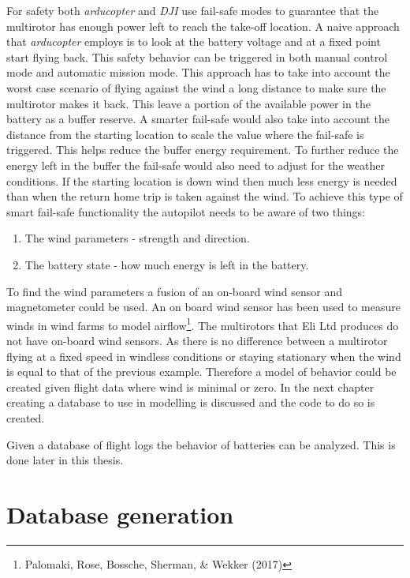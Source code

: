 \documentclass[12pt,oneside]{reedthesis}
\theoremstyle{definition}
\theoremstyle{definition}
\theoremstyle{definition}
\theoremstyle{remark}
\begin{document}
For safety both \emph{arducopter} and \emph{DJI} use fail-safe modes to
guarantee that the multirotor has enough power left to reach the
take-off location. A naive approach that \emph{arducopter} employs is to
look at the battery voltage and at a fixed point start flying back. This
safety behavior can be triggered in both manual control mode and
automatic mission mode. This approach has to take into account the worst
case scenario of flying against the wind a long distance to make sure
the multirotor makes it back. This leave a portion of the available
power in the battery as a buffer reserve. A smarter fail-safe would also
take into account the distance from the starting location to scale the
value where the fail-safe is triggered. This helps reduce the buffer
energy requirement. To further reduce the energy left in the buffer the
fail-safe would also need to adjust for the weather conditions. If the
starting location is down wind then much less energy is needed than when
the return home trip is taken against the wind. To achieve this type of
smart fail-safe functionality the autopilot needs to be aware of two
things:
\begin{enumerate}
\def\labelenumi{\arabic{enumi}.}
\item
  The wind parameters - strength and direction.
\item
  The battery state - how much energy is left in the battery.
\end{enumerate}
To find the wind parameters a fusion of an on-board wind sensor and
magnetometer could be used. An on board wind sensor has been used to
measure winds in wind farms to model airflow\footnote{Palomaki, Rose,
  Bossche, Sherman, \& Wekker (2017)}. The multirotors that Eli Ltd
produces do not have on-board wind sensors. As there is no difference
between a multirotor flying at a fixed speed in windless conditions or
staying stationary when the wind is equal to that of the previous
example. Therefore a model of behavior could be created given flight
data where wind is minimal or zero. In the next chapter creating a
database to use in modelling is discussed and the code to do so is
created.

Given a database of flight logs the behavior of batteries can be
analyzed. This is done later in this thesis.

\chapter{Database generation}\label{dbs}
\end{document}
